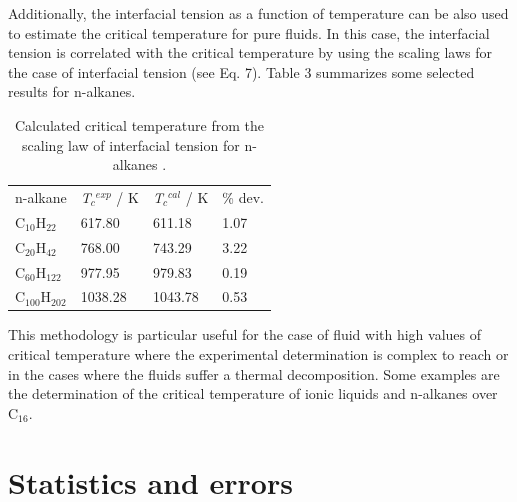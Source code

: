 \documentclass{scrbook}
\begin{document}
Additionally, the interfacial tension as a function of temperature can be also
used to estimate the critical temperature for pure fluids. In this case, the
interfacial tension is correlated with the critical temperature by using the
scaling laws for the case of interfacial tension (see Eq. 7). Table
3 summarizes some selected results for n-alkanes.
\begin{table}
  \caption{Calculated critical temperature from the scaling law of interfacial tension for n-alkanes \citep{muller2011}.}
  \label{tab:3}
\begin{tabularx}{\textwidth}{
p{}
p{}
p{}
p{}}
\centering\arraybackslash{}n-alkane & \centering\arraybackslash{}\textit{T}$_{c}$$^{exp}$ / K & \centering\arraybackslash{}\textit{T}$_{c}$$^{cal}$ / K & \centering\arraybackslash{}\% dev. \\
C$_{10}$H$_{22}$ & \centering\arraybackslash{}617.80 & \centering\arraybackslash{}611.18 & \centering\arraybackslash{}1.07 \\
C$_{20}$H$_{42}$ & \centering\arraybackslash{}768.00 & \centering\arraybackslash{}743.29 & \centering\arraybackslash{}3.22 \\
C$_{60}$H$_{122}$ & \centering\arraybackslash{}977.95 & \centering\arraybackslash{}979.83 & \centering\arraybackslash{}0.19 \\
C$_{100}$H$_{202}$ & \centering\arraybackslash{}1038.28 & \centering\arraybackslash{}1043.78 & \centering\arraybackslash{}0.53 \\
\end{tabularx}
\end{table}
This methodology is particular useful for the case of fluid with high values of
critical temperature where the experimental determination is complex to reach
or in the cases where the fluids suffer a thermal decomposition. Some examples
are the determination of the critical temperature of ionic liquids and
n-alkanes over C$_{16}$.

\section{Statistics and errors}
\end{document}
